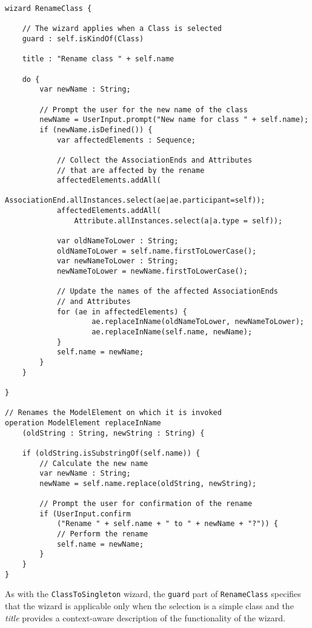 \begin{lstlisting}[float=tbp, 
	basicstyle=\ttfamily\footnotesize, 
	flexiblecolumns=true, 
	numbers=none, 
	nolol=true, 
	caption=Implementation of the RenameClass Wizard,
	label=lst:RenameClass, 
	numbers=left, 
	language=EWL, 
	tabsize=2
]
wizard RenameClass {
	
	// The wizard applies when a Class is selected
	guard : self.isKindOf(Class)
	
	title : "Rename class " + self.name
	
	do {
		var newName : String;
		
		// Prompt the user for the new name of the class
		newName = UserInput.prompt("New name for class " + self.name);
		if (newName.isDefined()) {
			var affectedElements : Sequence;
			
			// Collect the AssociationEnds and Attributes
			// that are affected by the rename
			affectedElements.addAll(
				AssociationEnd.allInstances.select(ae|ae.participant=self));
			affectedElements.addAll(
				Attribute.allInstances.select(a|a.type = self));
			
			var oldNameToLower : String;
			oldNameToLower = self.name.firstToLowerCase();
			var newNameToLower : String;
			newNameToLower = newName.firstToLowerCase();
			
			// Update the names of the affected AssociationEnds
			// and Attributes
			for (ae in affectedElements) {
					ae.replaceInName(oldNameToLower, newNameToLower);
					ae.replaceInName(self.name, newName);
			}
			self.name = newName;
		}
	}
	
}

// Renames the ModelElement on which it is invoked
operation ModelElement replaceInName
	(oldString : String, newString : String) {
	
	if (oldString.isSubstringOf(self.name)) {
		// Calculate the new name
		var newName : String;
		newName = self.name.replace(oldString, newString);
		
		// Prompt the user for confirmation of the rename
		if (UserInput.confirm
			("Rename " + self.name + " to " + newName + "?")) {
			// Perform the rename
			self.name = newName;
		}
	}
}
\end{lstlisting}
As with the \texttt{ClassToSingleton} wizard, the \texttt{guard} part of \texttt{RenameClass} specifies that the wizard is applicable only when the selection is a simple class and the \emph{title} provides a context-aware description of the functionality of the wizard. 


